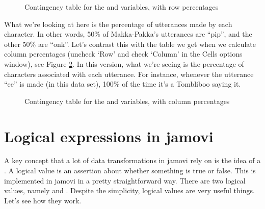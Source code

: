 \begin{figure}[h!!]
\begin{center}
\caption{Contingency table for the  and  variables, with row percentages}
\label{fig:contingencyrow}
\HR
\end{center}
\end{figure}

What we're looking at here is the percentage of utterances made by each character. In other words, 50\% of Makka-Pakka's utterances are ``pip'', and the other 50\% are ``onk''. Let's contrast this with the table we get when we calculate column percentages (uncheck `Row' and check `Column' in the Cells options window), see Figure \ref{fig:contingencycol}. In this version, what we're seeing is the percentage of characters associated with each utterance. For instance, whenever the utterance ``ee'' is made (in this data set), 100\% of the time it's a Tombliboo saying it. 

\begin{figure}[h!!]
\begin{center}
\caption{Contingency table for the  and  variables, with column percentages}
\label{fig:contingencycol}
\HR
\end{center}
\end{figure}





\section{Logical expressions in jamovi\label{sec:logicals}}

A key concept that a lot of data transformations in jamovi rely on is the idea of a . A logical value is an assertion about whether something is true or false. This is implemented in jamovi in a pretty straightforward way. There are two logical values, namely  and . Despite the simplicity, logical values are very useful things. Let's see how they work.


